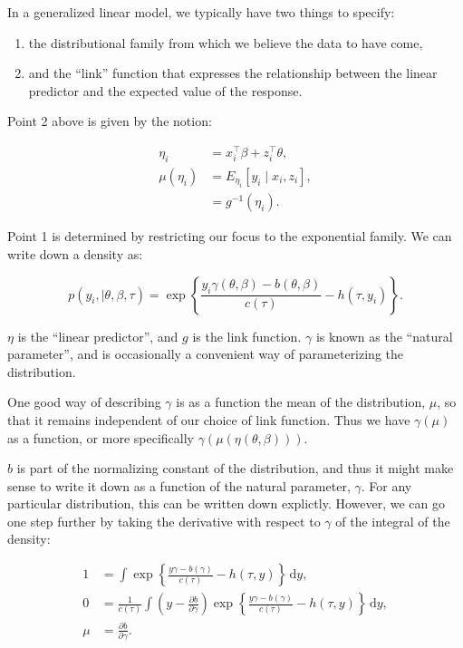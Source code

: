 \documentclass[10pt]{article}
\begin{document}
In a generalized linear model, we typically have two things to
specify:

\begin{enumerate}
\item the distributional family from which we believe the data to have
  come,
\item and the ``link'' function that expresses the relationship
  between the linear predictor and the expected value of the response.
\end{enumerate}

Point 2 above is given by the notion:

\begin{align*}
\eta_i & = x_i^\top\beta + z_i^\top\theta, \\
\mu(\eta_i) & = E_{\eta_i}[y_i \mid x_i, z_i], \\
& = g^{-1}(\eta_i).
\end{align*}

Point 1 is determined by restricting our focus to the exponential
family. We can write down a density as:

\begin{equation*}
p(y_i, \mid \theta, \beta, \tau) = \exp\left\{\frac{y_i \gamma(\theta,
      \beta) - b(\theta, \beta)}{c(\tau)} - h(\tau, y_i)\right\}.
\end{equation*}

\noindent $\eta$ is the ``linear predictor'', and $g$ is the link
function. $\gamma$ is known as the ``natural parameter'', and is
occasionally a convenient way of parameterizing the distribution.

One good way of describing $\gamma$ is as a function the mean of the
distribution, $\mu$, so that it remains independent of our choice of
link function. Thus we have $\gamma(\mu)$ as a function, or more
specifically $\gamma(\mu(\eta(\theta, \beta)))$.

$b$ is part of the normalizing constant of the distribution, and thus
it might make sense to write it down as a function of the natural
parameter, $\gamma$. For any particular distribution, this can be
written down explictly. However, we can go one step further by taking the derivative with respect to $\gamma$
of the integral of the density:

\begin{align*}
1 & = \int \exp\left\{\frac{y \gamma - b(\gamma)}{c(\tau)} - h(\tau, y)\right\}
  \,\mathrm{d}y, \\
0 & = \frac{1}{c(\tau)} \int \left(y - \frac{\partial
      b}{\partial\gamma} \right)
   \exp\left\{\frac{y \gamma - b(\gamma)}{c(\tau)} - h(\tau, y)\right\}
  \,\mathrm{d}y, \\
\mu & = \frac{\partial b}{\partial\gamma}.
\end{align*}
\end{document}

